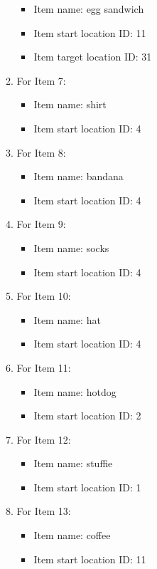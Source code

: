 \documentclass[11pt]{article}
\begin{document}
\begin{enumerate}
\begin{enumerate}
    \begin{itemize}
    \item Item name: egg sandwich
    \item Item start location ID: 11
    \item Item target location ID: 31
    \end{itemize}
    \item For Item 7:
    \begin{itemize}
    \item Item name: shirt
    \item Item start location ID: 4
    \end{itemize}
        \item For Item 8:
    \begin{itemize}
    \item Item name: bandana
    \item Item start location ID: 4
    \end{itemize}
        \item For Item 9:
    \begin{itemize}
    \item Item name: socks
    \item Item start location ID: 4
    \end{itemize}
        \item For Item 10:
    \begin{itemize}
    \item Item name: hat
    \item Item start location ID: 4
    \end{itemize}
        \item For Item 11:
    \begin{itemize}
    \item Item name: hotdog
    \item Item start location ID: 2
    \end{itemize}
        \item For Item 12:
    \begin{itemize}
    \item Item name: stuffie
    \item Item start location ID: 1
    \end{itemize}
        \item For Item 13:
    \begin{itemize}
    \item Item name: coffee
    \item Item start location ID: 11
    \end{itemize}

\end{enumerate}
\end{enumerate}
\end{document}
